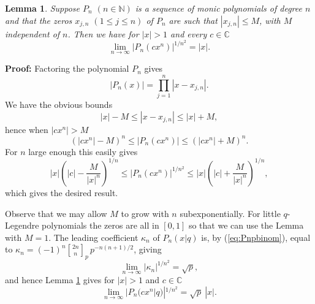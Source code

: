 \documentclass[12pt]{article}
\DeclareRobustCommand{\qbinom}{\genfrac[]{0pt}{}}
\newtheorem{lemma}{Lemma}
\begin{document}
\begin{lemma}  \label{lem:Pn}
Suppose $P_n$ $(n \in \mathbb{N})$ is a sequence of monic polynomials of degree $n$ and that the zeros $x_{j,n}$ $(1 \leq j \leq n)$ of $P_n$ are
such that $|x_{j,n}| \leq M$, with $M$ independent of $n$. Then
we have for $|x|>1$ and every
$c \in \mathbb{C}$
\begin{equation}       
  \lim_{n\to\infty} |P_n(cx^n)|^{1/n^2} =  |x|.
\end{equation}
\end{lemma}
\textbf{Proof:}
Factoring the polynomial $P_n$ gives
\[  |P_n(x)| = \prod_{j=1}^n |x-x_{j,n}|. \]
We have the obvious bounds
\[   |x| - M    \leq |x-x_{j,n}| \leq |x| + M, \]
hence when $|cx^n| > M$ 
\[  ( |cx^n|-M )^n \leq |P_n(cx^n)| \leq (|cx^n| + M)^n. \]
For $n$ large enough this easily gives
\[   |x| \left(|c| - \frac{M}{|x|^n} \right)^{1/n} \leq |P_n(cx^n)|^{1/n^2}
  \leq |x| \left( |c| + \frac{M}{|x|^n} \right)^{1/n}, \]
which gives the desired result.
\ \framebox{}
\bigskip

Observe that we may allow $M$ to grow with $n$  subexponentially. For
little $q$-Legendre polynomials the zeros are all in $[0,1]$ so that
we can use the Lemma with $M=1$. The
leading coefficient $\kappa_n$ of $P_n(x|q)$ is, by (\ref{eq:Pnpbinom}), equal to
$\kappa_n=(-1)^n \qbinom{2n}{n}_p\, p^{-n(n+1)/2}$, giving
\[  \lim_{n \to \infty} |\kappa_n|^{1/n^2} = \sqrt{p}, \]
and hence Lemma \ref{lem:Pn} gives for $|x| > 1$ and $c \in \mathbb{C}$
\begin{equation}  \label{eq:Pnasym}      
  \lim_{n\to\infty} |P_n(cx^n|q)|^{1/n^2} =  \sqrt{p}\ |x|.
\end{equation}
\end{document}
